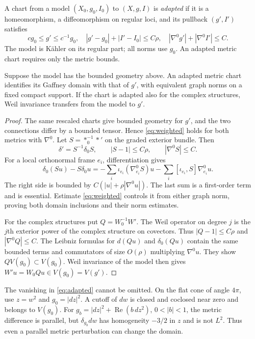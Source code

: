 \begin{definition}\label{def:adapted}
A chart from a model $(X_0,g_0,I_0)$ to $(X,g,I)$ is
\emph{adapted} if it is a homeomorphism, a diffeomorphism on regular
loci, and its pullback $(g',I')$ satisfies
\begin{equation}\label{eq:adapted}
 cg_0\le g'\le c^{-1}g_0,\quad
 |g'-g_0|+|I'-I_0|\le C\rho,\quad
 |\nabla^0g'|+|\nabla^0I'|\le C.
\end{equation}
The model is K\"ahler on its regular part; all norms use $g_0$.
An adapted metric chart requires only the metric bounds.
\end{definition}

\begin{theorem}\label{thm:comparison}
Suppose the model has the bounded geometry above. An adapted
metric chart identifies its Gaffney domain with that of $g'$, with
equivalent graph norms on a fixed compact support. If the chart is
adapted also for the complex structures, Weil invariance transfers
from the model to $g'$.
\end{theorem}
\begin{proof}
The same rescaled charts give bounded geometry for $g'$, and the
two connections differ by a bounded tensor. Hence
\eqref{eq:weighted} holds for both metrics with $\nabla^0$.
Let $S=*_{0}^{-1}*'$ on the graded exterior bundle. Then
\[
 \delta'=S^{-1}\delta_0S,\qquad |S-1|\le C\rho,
 \qquad |\nabla^0S|\le C.
\]
For a local orthonormal frame $e_i$, differentiation gives
\begin{equation}\label{eq:star-commutator}
 \delta_0(Su)-S\delta_0u
 =-\sum_i\iota_{e_i}(\nabla^0_{e_i}S)u
   -\sum_i[\iota_{e_i},S]\nabla^0_{e_i}u.
\end{equation}
The right side is bounded by $C(|u|+\rho|\nabla^0u|)$.
The last sum is a first-order term and is essential. Estimate
\eqref{eq:weighted} controls it from either graph norm, proving
both domain inclusions and their norm estimates.

For the complex structures put $Q=W_0^{-1}W'$. The Weil operator
on degree $j$ is the $j$th exterior power of the complex structure
on covectors. Thus $|Q-1|\le C\rho$ and $|\nabla^0Q|\le C$.
The Leibniz formulas for $d(Qu)$ and $\delta_0(Qu)$ contain the
same bounded terms and commutators of size $O(\rho)$ multiplying
$\nabla^0u$. They show $Q V(g_0)\subset V(g_0)$. Weil invariance
of the model then gives $W'u=W_0Qu\in V(g_0)=V(g')$.
\end{proof}

The vanishing in \eqref{eq:adapted} cannot be omitted. On the flat
cone of angle $4\pi$, use $z=w^2$ and $g_0=|dz|^2$.
A cutoff of $dw$ is closed and coclosed near zero and belongs to
$V(g_0)$. For $g_b=|dz|^2+\operatorname{Re}(b\,dz^2)$,
$0<|b|<1$, the metric difference is parallel, but
$\delta_{g_b}dw$ has homogeneity $-3/2$ in $z$ and is not $L^2$.
Thus even a parallel metric perturbation can change the domain.

